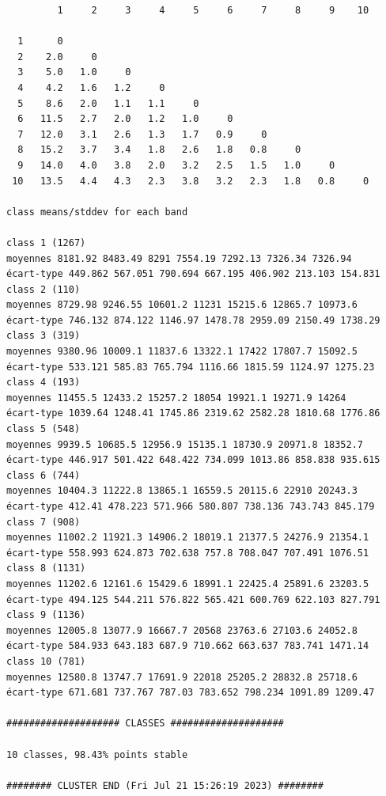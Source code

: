 \documentclass[land,article,submit,pdftex,moreauthors]{Definitions/mdpi}
\begin{document}
\begin{scriptsize}
\begin{verbatim}
         1     2     3     4     5     6     7     8     9    10

  1      0
  2    2.0     0
  3    5.0   1.0     0
  4    4.2   1.6   1.2     0
  5    8.6   2.0   1.1   1.1     0
  6   11.5   2.7   2.0   1.2   1.0     0
  7   12.0   3.1   2.6   1.3   1.7   0.9     0
  8   15.2   3.7   3.4   1.8   2.6   1.8   0.8     0
  9   14.0   4.0   3.8   2.0   3.2   2.5   1.5   1.0     0
 10   13.5   4.4   4.3   2.3   3.8   3.2   2.3   1.8   0.8     0

class means/stddev for each band

class 1 (1267)
moyennes 8181.92 8483.49 8291 7554.19 7292.13 7326.34 7326.94
écart-type 449.862 567.051 790.694 667.195 406.902 213.103 154.831
class 2 (110)
moyennes 8729.98 9246.55 10601.2 11231 15215.6 12865.7 10973.6
écart-type 746.132 874.122 1146.97 1478.78 2959.09 2150.49 1738.29
class 3 (319)
moyennes 9380.96 10009.1 11837.6 13322.1 17422 17807.7 15092.5
écart-type 533.121 585.83 765.794 1116.66 1815.59 1124.97 1275.23
class 4 (193)
moyennes 11455.5 12433.2 15257.2 18054 19921.1 19271.9 14264
écart-type 1039.64 1248.41 1745.86 2319.62 2582.28 1810.68 1776.86
class 5 (548)
moyennes 9939.5 10685.5 12956.9 15135.1 18730.9 20971.8 18352.7
écart-type 446.917 501.422 648.422 734.099 1013.86 858.838 935.615
class 6 (744)
moyennes 10404.3 11222.8 13865.1 16559.5 20115.6 22910 20243.3
écart-type 412.41 478.223 571.966 580.807 738.136 743.743 845.179
class 7 (908)
moyennes 11002.2 11921.3 14906.2 18019.1 21377.5 24276.9 21354.1
écart-type 558.993 624.873 702.638 757.8 708.047 707.491 1076.51
class 8 (1131)
moyennes 11202.6 12161.6 15429.6 18991.1 22425.4 25891.6 23203.5
écart-type 494.125 544.211 576.822 565.421 600.769 622.103 827.791
class 9 (1136)
moyennes 12005.8 13077.9 16667.7 20568 23763.6 27103.6 24052.8
écart-type 584.933 643.183 687.9 710.662 663.637 783.741 1471.14
class 10 (781)
moyennes 12580.8 13747.7 17691.9 22018 25205.2 28832.8 25718.6
écart-type 671.681 737.767 787.03 783.652 798.234 1091.89 1209.47

#################### CLASSES ####################

10 classes, 98.43% points stable

######## CLUSTER END (Fri Jul 21 15:26:19 2023) ########
\end{verbatim}
\end{scriptsize}
\end{document}
